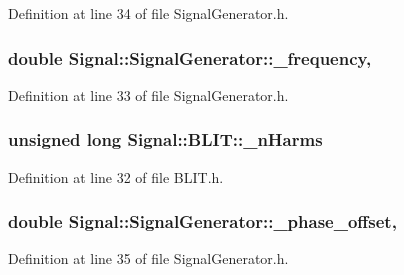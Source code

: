 Definition at line 34 of file Signal\+Generator.\+h.

\hypertarget{class_signal_1_1_signal_generator_a7f107461333bce68c5dad412db96a8c2}{
\subsubsection[{\+\_\+frequency}]{\setlength{\rightskip}{0pt plus 5cm}double Signal\+::\+Signal\+Generator\+::\+\_\+frequency\hspace{0.3cm}{\ttfamily [protected]}, {\ttfamily [inherited]}}}\label{class_signal_1_1_signal_generator_a7f107461333bce68c5dad412db96a8c2}


Definition at line 33 of file Signal\+Generator.\+h.

\hypertarget{class_signal_1_1_b_l_i_t_a9ec3a46bd37f7d76a8924dd7dd3622bd}{
\subsubsection[{\+\_\+n\+Harms}]{\setlength{\rightskip}{0pt plus 5cm}unsigned long Signal\+::\+B\+L\+I\+T\+::\+\_\+n\+Harms\hspace{0.3cm}{\ttfamily [protected]}}}\label{class_signal_1_1_b_l_i_t_a9ec3a46bd37f7d76a8924dd7dd3622bd}


Definition at line 32 of file B\+L\+I\+T.\+h.

\hypertarget{class_signal_1_1_signal_generator_a6b4444d46747c8517171edbbf4b5588f}{
\subsubsection[{\+\_\+phase\+\_\+offset}]{\setlength{\rightskip}{0pt plus 5cm}double Signal\+::\+Signal\+Generator\+::\+\_\+phase\+\_\+offset\hspace{0.3cm}{\ttfamily [protected]}, {\ttfamily [inherited]}}}\label{class_signal_1_1_signal_generator_a6b4444d46747c8517171edbbf4b5588f}


Definition at line 35 of file Signal\+Generator.\+h.

